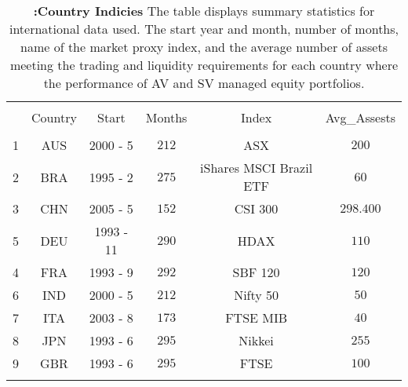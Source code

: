 
\begin{table}[!htbp] \centering 
  \centering \caption{\textbf{:Country Indicies} \newline
  	\footnotesize{The table displays summary statistics for international data used. The start year and month, number of months, name of the market proxy index, and the average number of assets meeting the trading and liquidity requirements for each country where the performance of AV and SV managed equity portfolios.}} \vspace{3mm}
  \label{tab:tab_int_summary}
\begin{tabular}{@{\extracolsep{5pt}} Hccccc} 
\\[-1.8ex]\hline 
\hline \\[-1.8ex] 
 & Country & Start & Months & Index & Avg\_Assests \\ 
\hline \\[-1.8ex] 
1 & AUS & 2000 - 5 & $212$& ASX & $200$ \\ 
2 & BRA & 1995 - 2 & $275$& iShares MSCI Brazil ETF& $60$ \\ 
3 & CHN & 2005 - 5 & $152$& CSI 300& $298.400$ \\ 
5 & DEU & 1993 - 11 & $290$& HDAX& $110$ \\
4 & FRA & 1993 - 9 & $292$& SBF 120& $120$ \\ 
6 & IND & 2000 - 5 & $212$& Nifty 50& $50$ \\ 
7 & ITA & 2003 - 8 & $173$& FTSE MIB& $40$ \\ 
8 & JPN & 1993 - 6 & $295$& Nikkei& $255$ \\ 
9 & GBR & 1993 - 6 & $295$& FTSE& $100$ \\ 
\hline \\[-1.8ex] 
\end{tabular} 
\end{table} 
